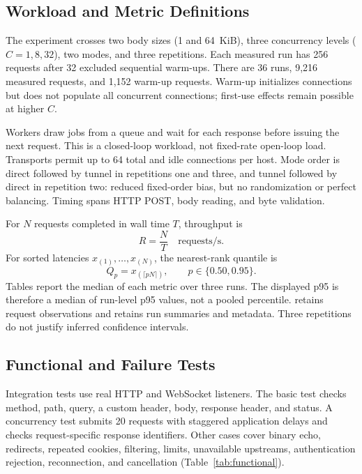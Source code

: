 \documentclass[conference,letterpaper]{IEEEtran}
\begin{document}
\subsection{Workload and Metric Definitions}
The experiment crosses two body sizes (1 and 64~KiB), three concurrency levels
($C=1,8,32$), two modes, and three repetitions. Each measured run has 256
requests after 32 excluded sequential warm-ups. There are 36 runs, 9,216
measured requests, and 1,152 warm-up requests. Warm-up initializes connections
but does not populate all concurrent connections; first-use effects remain
possible at higher $C$.

Workers draw jobs from a queue and wait for each response before issuing the
next request. This is a closed-loop workload, not fixed-rate open-loop load.
Transports permit up to 64 total and idle connections per host. Mode order is
direct followed by tunnel in repetitions one and three, and tunnel followed by
direct in repetition
two: reduced fixed-order bias, but no randomization or perfect balancing.
Timing spans HTTP POST, body reading, and byte validation.

For $N$ requests completed in wall time $T$, throughput is
\begin{equation}
 R=\frac{N}{T}\quad\text{requests/s}.
 \label{eq:throughput}
\end{equation}
For sorted latencies $x_{(1)},\ldots,x_{(N)}$, the nearest-rank quantile is
\begin{equation}
 Q_p=x_{(\lceil pN\rceil)},\qquad p\in\{0.50,0.95\}.
 \label{eq:quantile}
\end{equation}
Tables report the median of each metric over three runs. The displayed p95 is
therefore a median of run-level p95 values, not a pooled percentile.
 retains request observations and 
retains run summaries and metadata. Three repetitions do not justify inferred
confidence intervals.

\subsection{Functional and Failure Tests}
Integration tests use real HTTP and WebSocket listeners. The basic test checks
method, path, query, a custom header, body, response header, and status. A
concurrency test submits 20 requests with staggered application delays and
checks request-specific response identifiers. Other cases cover binary echo,
redirects, repeated cookies, filtering, limits, unavailable upstreams,
authentication rejection, reconnection, and cancellation
(Table~\ref{tab:functional}).
\end{document}
